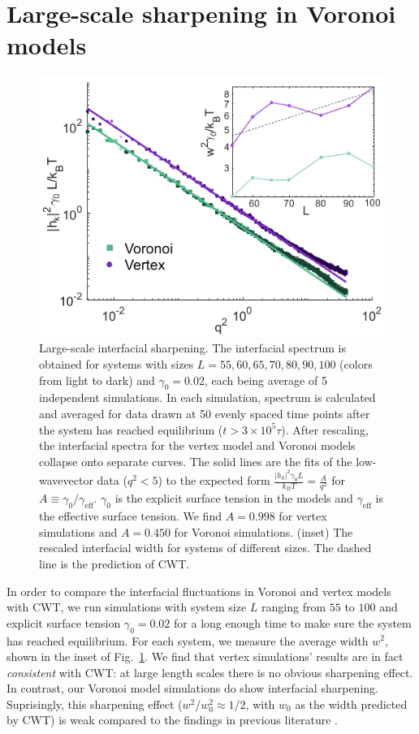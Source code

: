 \documentclass[twoside,twocolumn,9pt]{article}
\begin{document}
\section{Large-scale sharpening in Voronoi models}
\begin{figure}[t]
    \centering
    \includegraphics[width=0.9\columnwidth]{Figure0.pdf}
    \caption{Large-scale interfacial sharpening. The interfacial spectrum is obtained for systems with sizes $L=55, 60, 65, 70, 80, 90, 100$ (colors from light to dark) and $\gamma_0=0.02$, each being average of 5 independent simulations. In each simulation, spectrum is calculated and averaged for data drawn at 50 evenly spaced time points after the system has reached equilibrium ($t>3\times 10^5 \tau$). After rescaling, the interfacial spectra for the vertex model and Voronoi models collapse onto separate curves. The solid lines are the fits of the low-wavevector data ($q^2 < 5$) to the expected form $ \frac{|h_k|^2\gamma_0 L}{k_B T} = \frac{A}{q^2}$ for $A\equiv \gamma_0/\gamma_{\text{eff}}$. $\gamma_0$ is the explicit surface tension in the models and $\gamma_{\text{eff}}$ is the effective surface tension. We find $A=0.998$ for vertex simulations and $A=0.450$ for Voronoi simulations. (inset) The rescaled interfacial width for systems of different sizes. The dashed line is the prediction of CWT.}
    \label{fig:large_scale}
\end{figure}

In order to compare the interfacial fluctuations in Voronoi and vertex models with CWT, we run simulations with system size $L$ ranging from $55$ to $100$ and explicit surface tension $\gamma_0=0.02$ for a long enough time to make sure the system has reached equilibrium. For each system, we measure the average width $w^2$, shown in the inset of Fig.~\ref{fig:large_scale}. We find that vertex simulations' results are in fact \emph{consistent} with CWT: at large length scales there is no obvious sharpening effect. In contrast, our Voronoi model simulations do show interfacial sharpening. Suprisingly, this sharpening effect ($w^2/w_0^2\approx 1/2$, with $w_0$ as the width predicted by CWT) is weak compared to the findings in previous literature \cite{sussman2018soft}. 
\end{document}
